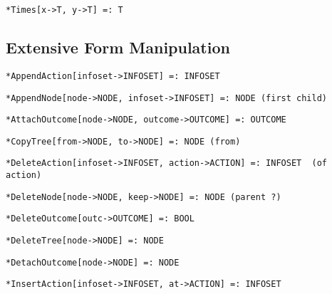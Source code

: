 \protect \large \begin{verbatim}
*Times[x->T, y->T] =: T
\end{verbatim} \normalsize

\medskip
\subsection{Extensive Form Manipulation}

\protect \large \begin{verbatim}
*AppendAction[infoset->INFOSET] =: INFOSET
\end{verbatim}\normalsize

\protect \large \begin{verbatim} 
*AppendNode[node->NODE, infoset->INFOSET] =: NODE (first child)
\end{verbatim}\normalsize

\protect \large \begin{verbatim} 
*AttachOutcome[node->NODE, outcome->OUTCOME] =: OUTCOME
\end{verbatim}\normalsize

\protect \large \begin{verbatim}
*CopyTree[from->NODE, to->NODE] =: NODE (from)
\end{verbatim}\normalsize

\protect \large \begin{verbatim}
*DeleteAction[infoset->INFOSET, action->ACTION] =: INFOSET  (of action)
\end{verbatim}\normalsize

\protect \large \begin{verbatim}
*DeleteNode[node->NODE, keep->NODE] =: NODE (parent ?)  
\end{verbatim}\normalsize

\protect \large \begin{verbatim}
*DeleteOutcome[outc->OUTCOME] =: BOOL
\end{verbatim}\normalsize

\protect \large \begin{verbatim}
*DeleteTree[node->NODE] =: NODE
\end{verbatim}\normalsize

\protect \large \begin{verbatim}
*DetachOutcome[node->NODE] =: NODE
\end{verbatim}\normalsize

\protect \large \begin{verbatim}
*InsertAction[infoset->INFOSET, at->ACTION] =: INFOSET 
\end{verbatim}\normalsize

